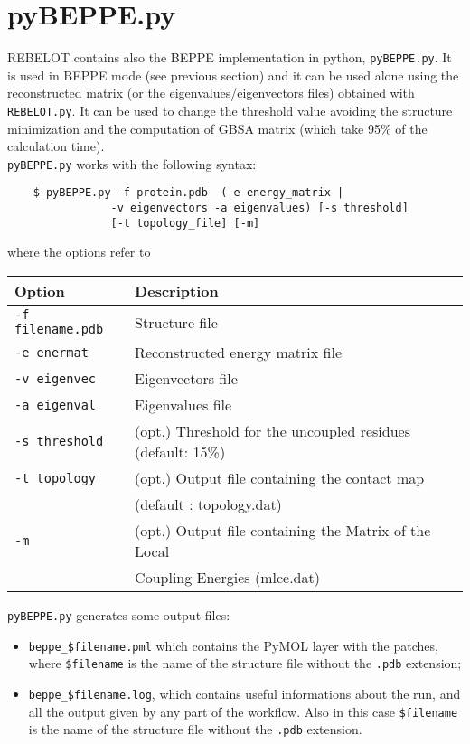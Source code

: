 \documentclass[a4paper,12pt]{book}
\begin{document}
\section{pyBEPPE.py}
REBELOT contains also the BEPPE implementation in python, \texttt{pyBEPPE.py}. It is used in BEPPE mode (see previous section) and it can be used alone using the reconstructed matrix (or the eigenvalues/eigenvectors files) obtained with \texttt{REBELOT.py}. It can be used to change the threshold value avoiding the structure minimization and the computation of GBSA matrix (which take 95\% of the calculation time). \\
\texttt{pyBEPPE.py} works with the following syntax:
\begin{lstlisting}
	$ pyBEPPE.py -f protein.pdb  (-e energy_matrix | 
				-v eigenvectors -a eigenvalues) [-s threshold] 
				[-t topology_file] [-m]
\end{lstlisting}
where the options refer to
\begin{center}
\begin{tabular}{lll}
\toprule
Option & Description\\
\midrule
\texttt{-f filename.pdb}   & Structure file \\
\texttt{-e enermat}  & Reconstructed energy matrix file  \\
\texttt{-v eigenvec}  & Eigenvectors file \\
\texttt{-a eigenval}  & Eigenvalues file \\
\texttt{-s threshold}  & (opt.) Threshold for the uncoupled residues (default: 15\%) \\
\texttt{-t topology}  & (opt.) Output file containing the contact map \\
&(default : topology.dat)\\
\texttt{-m}  & (opt.) Output file containing the Matrix of the Local  \\
&Coupling Energies (mlce.dat) \\
\bottomrule
\end{tabular}
\end{center}
\texttt{pyBEPPE.py} generates some output files:
\begin{itemize}
	\item \texttt{beppe\_\$filename.pml} which contains the PyMOL layer with the patches, where \texttt{\$filename} is the name of the structure file without the \texttt{.pdb} extension;
	\item \texttt{beppe\_\$filename.log}, which contains useful informations about the run, and all the output given by any part of the workflow. Also in this case \texttt{\$filename} is the name of the structure file without the \texttt{.pdb} extension.
\end{itemize}

\cleardoublepage
{}
\nocite{*}


\end{document}
